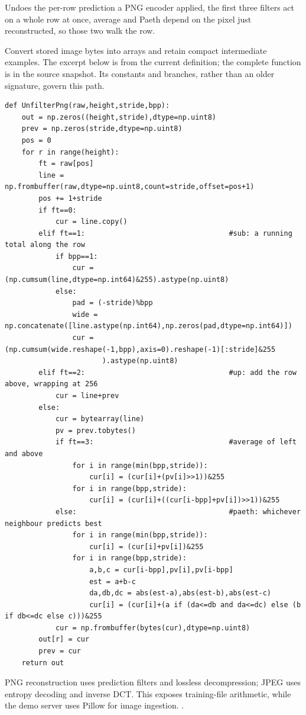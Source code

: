 Undoes the per-row prediction a PNG encoder applied, the first three filters act on a whole row at once, average and Paeth depend on the pixel just reconstructed, so those two walk the row.


Convert stored image bytes into arrays and retain compact intermediate examples. The excerpt below is from the current definition; the complete function is in the source snapshot. Its constants and branches, rather than an older signature, govern this path.


\begin{lstlisting}[style=plain]
def UnfilterPng(raw,height,stride,bpp):
    out = np.zeros((height,stride),dtype=np.uint8)
    prev = np.zeros(stride,dtype=np.uint8)
    pos = 0
    for r in range(height):
        ft = raw[pos]
        line = np.frombuffer(raw,dtype=np.uint8,count=stride,offset=pos+1)
        pos += 1+stride
        if ft==0:
            cur = line.copy()
        elif ft==1:                                  #sub: a running total along the row
            if bpp==1:
                cur = (np.cumsum(line,dtype=np.int64)&255).astype(np.uint8)
            else:
                pad = (-stride)%bpp
                wide = np.concatenate([line.astype(np.int64),np.zeros(pad,dtype=np.int64)])
                cur = (np.cumsum(wide.reshape(-1,bpp),axis=0).reshape(-1)[:stride]&255
                       ).astype(np.uint8)
        elif ft==2:                                  #up: add the row above, wrapping at 256
            cur = line+prev
        else:
            cur = bytearray(line)
            pv = prev.tobytes()
            if ft==3:                                #average of left and above
                for i in range(min(bpp,stride)):
                    cur[i] = (cur[i]+(pv[i]>>1))&255
                for i in range(bpp,stride):
                    cur[i] = (cur[i]+((cur[i-bpp]+pv[i])>>1))&255
            else:                                    #paeth: whichever neighbour predicts best
                for i in range(min(bpp,stride)):
                    cur[i] = (cur[i]+pv[i])&255
                for i in range(bpp,stride):
                    a,b,c = cur[i-bpp],pv[i],pv[i-bpp]
                    est = a+b-c
                    da,db,dc = abs(est-a),abs(est-b),abs(est-c)
                    cur[i] = (cur[i]+(a if (da<=db and da<=dc) else (b if db<=dc else c)))&255
            cur = np.frombuffer(bytes(cur),dtype=np.uint8)
        out[r] = cur
        prev = cur
    return out
\end{lstlisting}
PNG reconstruction uses prediction filters and lossless decompression; JPEG uses entropy decoding and inverse DCT. This exposes training-file arithmetic, while the demo server uses Pillow for image ingestion. \cite{pngspec,jpegspec,pillowimage}.


